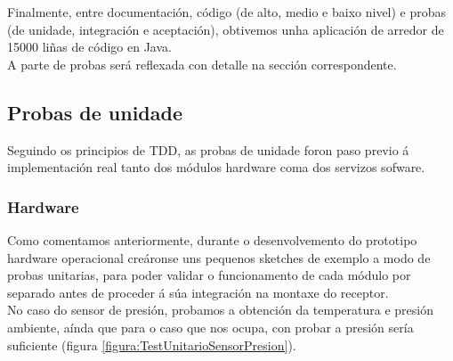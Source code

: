    Finalmente, entre documentación, código (de alto, medio e baixo nivel) e
   probas (de unidade, integración e aceptación), obtivemos unha aplicación de
   arredor de 15000 liñas de código en Java. \\
   
   A parte de probas será reflexada con detalle na sección correspondente.
   
 \subsection{Probas de unidade}
 
 Seguindo os principios de TDD, as probas de unidade foron paso previo á
 implementación real tanto dos módulos hardware coma dos servizos sofware.
 
  \subsubsection{Hardware}
  
  Como comentamos anteriormente, durante o desenvolvemento do prototipo hardware
  operacional creáronse uns pequenos sketches de exemplo a modo de probas
  unitarias, para poder validar o funcionamento de cada módulo por separado
  antes de proceder á súa integración na montaxe do receptor. \\
  
  No caso do sensor de presión, probamos a obtención da temperatura e presión
  ambiente, aínda que para o caso que nos ocupa, con probar a presión sería
  suficiente (figura \ref{figura:TestUnitarioSensorPresion}). \\
  
